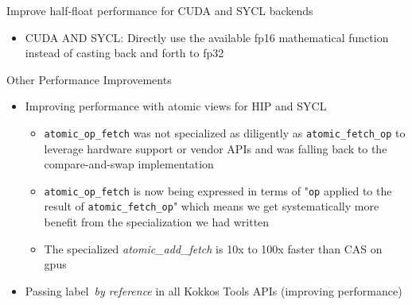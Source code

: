 \begin{frame}[fragile]{Improve half-float performance for CUDA and SYCL backends}
  \begin{itemize}
    \item CUDA AND SYCL: Directly use the available fp16 mathematical function instead of casting back and forth to fp32
  \end{itemize}
\end{frame}



\begin{frame}[fragile]{Other Performance Improvements}
  \begin{itemize}
  \item {Improving performance with atomic views for HIP and SYCL}
     \begin{itemize}
      \item \texttt{atomic\_op\_fetch} was not specialized as diligently as \texttt{atomic\_fetch\_op} to leverage hardware support or vendor APIs and was falling back to the compare-and-swap implementation
      \item \texttt{atomic\_op\_fetch} is now being expressed in terms of "\texttt{op} applied to the result of \texttt{atomic\_fetch\_op}" which means we get systematically more benefit from the specialization we had written
      \item The specialized \emph{atomic\_add\_fetch} is 10x to 100x faster than CAS on gpus
    \end{itemize}
     \item Passing label~\emph{by reference} in all Kokkos Tools APIs (improving performance)
  \end{itemize}
\end{frame}

